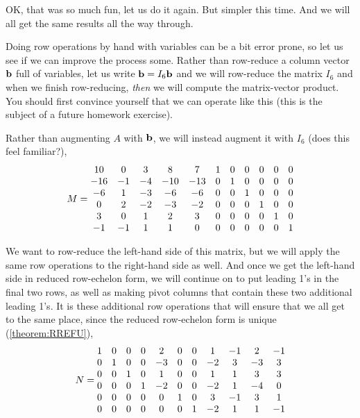 \documentclass{ximera}
\begin{document}
\begin{example}[Redux]
  OK, that was so much fun, let us do it again.  But simpler this
  time.  And we will all get the same results all the way through.

  Doing row operations by hand with variables can be a bit error
  prone, so let us see if we can improve the process some.  Rather
  than row-reduce a column vector $\mathbf{b}$ full of variables, let us
  write $\mathbf{b}=I_6\mathbf{b}$ and we will row-reduce the matrix $I_6$
  and when we finish row-reducing, \textit{then} we will compute the
  matrix-vector product.  You should first convince yourself that we
  can operate like this (this is the subject of a future homework
  exercise).

  Rather than augmenting $A$ with $\mathbf{b}$, we will instead augment
  it with $I_6$ (does this feel familiar?),
  \[
    M=
    \begin{array}{@{}*{11}{c}@{}}
       10 &  0 &  3 &   8 &   7 & 1 & 0 & 0 & 0 & 0 & 0 \\
      -16 & -1 & -4 & -10 & -13 & 0 & 1 & 0 & 0 & 0 & 0 \\
       -6 &  1 & -3 &  -6 &  -6 & 0 & 0 & 1 & 0 & 0 & 0 \\
        0 &  2 & -2 &  -3 &  -2 & 0 & 0 & 0 & 1 & 0 & 0 \\
        3 &  0 &  1 &   2 &   3 & 0 & 0 & 0 & 0 & 1 & 0 \\
       -1 & -1 &  1 &   1 &   0 & 0 & 0 & 0 & 0 & 0 & 1
    \end{array}
  \]

  We want to row-reduce the left-hand side of this matrix, but we will
  apply the same row operations to the right-hand side as well.  And
  once we get the left-hand side in reduced row-echelon form, we will
  continue on to put leading 1's in the final two rows, as well as
  making pivot columns that contain these two additional leading 1's.
  It is these additional row operations that will ensure that we all
  get to the same place, since the reduced row-echelon form is unique
  (\ref{theorem:RREFU}),
  \[
    N=
    \begin{array}{@{}*{11}{c}@{}}
      1 & 0 & 0 & 0 & 2 & 0 & 0 & 1 & -1 & 2 & -1 \\
      0 & 1 & 0 & 0 & -3 & 0 & 0 & -2 & 3 & -3 & 3 \\
      0 & 0 & 1 & 0 & 1 & 0 & 0 & 1 & 1 & 3 & 3 \\
      0 & 0 & 0 & 1 & -2 & 0 & 0 & -2 & 1 & -4 & 0 \\
      0 & 0 & 0 & 0 & 0 & 1 & 0 & 3 & -1 & 3 & 1 \\
      0 & 0 & 0 & 0 & 0 & 0 & 1 & -2 & 1 & 1 & -1
    \end{array}
  \]


\end{example}
\end{document}
